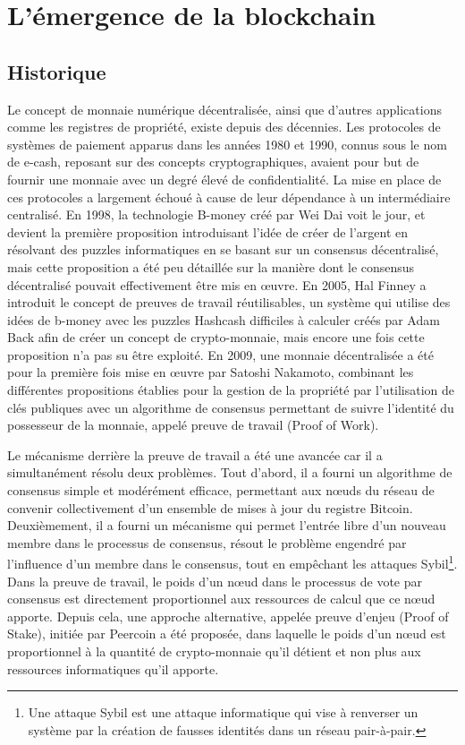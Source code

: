 \documentclass{tnreport}
\begin{document}
\section{L'émergence de la blockchain}

\subsection{Historique}

Le concept de monnaie numérique décentralisée, ainsi que d'autres applications comme les registres de propriété, existe depuis des décennies. 
Les protocoles de systèmes de paiement apparus dans les années 1980 et 1990, connus sous le nom de e-cash\cite{ecash}, reposant sur des concepts cryptographiques, avaient pour but de fournir une monnaie avec un degré élevé de confidentialité. La mise en place de ces protocoles a largement échoué à cause de leur dépendance à un intermédiaire centralisé. 
En 1998, la technologie B-money\cite{bmoney} créé par Wei Dai voit le jour, et devient la première proposition introduisant l'idée de créer de l'argent en résolvant des puzzles informatiques en se basant sur un consensus décentralisé, mais cette proposition a été peu détaillée sur la manière dont le consensus décentralisé pouvait effectivement être mis en œuvre. 
En 2005, Hal Finney a introduit le concept de preuves de travail réutilisables, un système qui utilise des idées de b-money avec les puzzles Hashcash\cite{hashcash} difficiles à calculer créés par Adam Back afin de créer un concept de crypto-monnaie, mais encore une fois cette proposition n'a pas su être exploité. 
En 2009, une monnaie décentralisée a été pour la première fois mise en œuvre par Satoshi Nakamoto, combinant les différentes propositions établies pour la gestion de la propriété par l'utilisation de clés publiques avec un algorithme de consensus permettant de suivre l'identité du possesseur de la monnaie, appelé preuve de travail (Proof of Work).

Le mécanisme derrière la preuve de travail a été une avancée car il a simultanément résolu deux problèmes. 
Tout d'abord, il a fourni un algorithme de consensus simple et modérément efficace, permettant aux nœuds du réseau de convenir collectivement d'un ensemble de mises à jour du registre Bitcoin. 
Deuxièmement, il a fourni un mécanisme qui permet l'entrée libre d'un nouveau membre dans le processus de consensus, résout le problème engendré par l'influence d'un membre dans le consensus, tout en empêchant les attaques Sybil\footnote{Une attaque Sybil est une attaque informatique qui vise à renverser un système par la création de fausses identités dans un réseau pair-à-pair.}. 
Dans la preuve de travail, le poids d'un nœud dans le processus de vote par consensus est directement proportionnel aux ressources de calcul que ce nœud apporte. 
Depuis cela, une approche alternative, appelée preuve d'enjeu (Proof of Stake), initiée par Peercoin\cite{peercoin} a été proposée, dans laquelle le poids d'un nœud est proportionnel à la quantité de crypto-monnaie qu'il détient et non plus aux ressources informatiques qu'il apporte.
\end{document}
